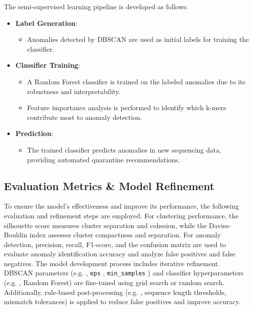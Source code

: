 The semi-supervised learning pipeline is developed as follows:

\begin{itemize}
    \item \textbf{Label Generation}:
    \begin{itemize}
        \item Anomalies detected by DBSCAN are used as initial labels for training the classifier.
    \end{itemize}

    \item \textbf{Classifier Training}:
    \begin{itemize}
        \item A Random Forest classifier is trained on the labeled anomalies due to its robustness and interpretability.
        \item Feature importance analysis is performed to identify which k-mers contribute most to anomaly detection.
    \end{itemize}

    \item \textbf{Prediction}:
    \begin{itemize}
        \item The trained classifier predicts anomalies in new sequencing data, providing automated quarantine recommendations.
    \end{itemize}
\end{itemize}

\subsection{Evaluation Metrics \& Model Refinement}
To ensure the model's effectiveness and improve its performance, the following evaluation and refinement steps are employed. For clustering performance, the silhouette score measures cluster separation and cohesion, while the Davies-Bouldin index assesses cluster compactness and separation. For anomaly detection, precision, recall, F1-score, and the confusion matrix are used to evaluate anomaly identification accuracy and analyze false positives and false negatives.
The model development process includes iterative refinement. DBSCAN parameters (e.g. , \texttt{eps} , \texttt{min\_samples} ) and classifier hyperparameters (e.g. , Random Forest) are fine-tuned using grid search or random search. Additionally, rule-based post-processing (e.g. , sequence length thresholds, mismatch tolerances) is applied to reduce false positives and improve accuracy.

